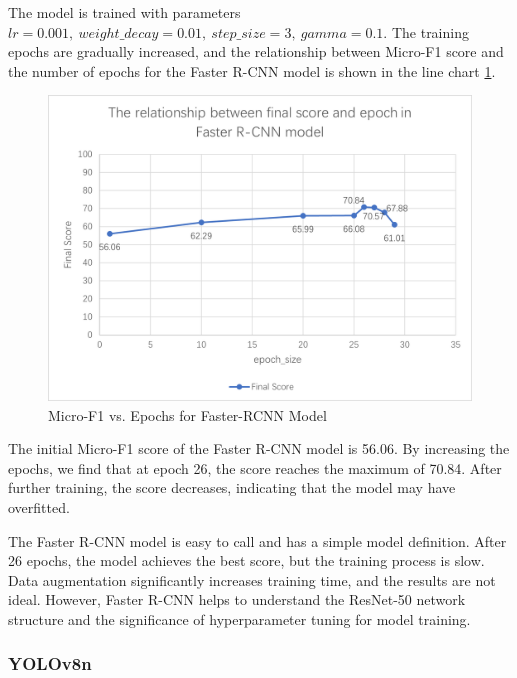 The model is trained with parameters $lr = 0.001,\ weight\_decay = 0.01,\ step\_size = 3,\ gamma = 0.1$. The training epochs are gradually increased, and the relationship between Micro-F1 score and the number of epochs for the Faster R-CNN model is shown in the line chart \cref{fig:faster-r-cnn}.
\begin{figure}[t]
  \centering
  \includegraphics[width=0.8\linewidth]{./graphs/图片1.png}

  \caption{Micro-F1 vs. Epochs for Faster-RCNN Model}
  \label{fig:faster-r-cnn}
\end{figure}

The initial Micro-F1 score of the Faster R-CNN model is 56.06. By increasing the epochs, we find that at epoch 26, the score reaches the maximum of 70.84. After further training, the score decreases, indicating that the model may have overfitted.

The Faster R-CNN model is easy to call and has a simple model definition. After 26 epochs, the model achieves the best score, but the training process is slow. Data augmentation significantly increases training time, and the results are not ideal. However, Faster R-CNN helps to understand the ResNet-50 network structure and the significance of hyperparameter tuning for model training.

\subsubsection{YOLOv8n}

